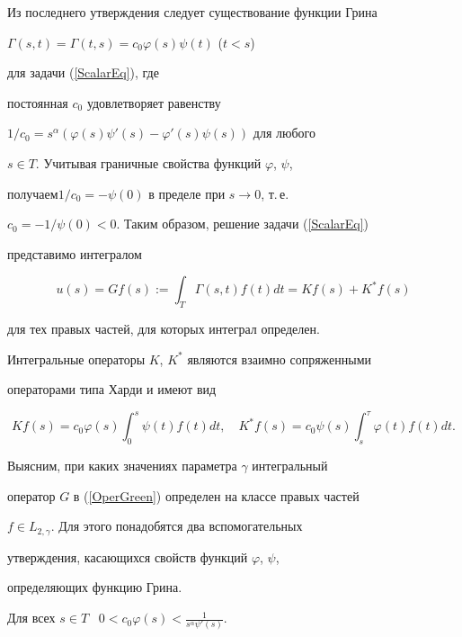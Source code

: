 Из последнего утверждения следует существование функции Грина


$\Gamma(s,t)=\Gamma(t,s)=c_0\varphi(s)\psi(t)$ ($t<s$)


для задачи (\ref{ScalarEq}), где


постоянная $c_0$ удовлетворяет равенству


$1/c_0=s^\alpha(\varphi(s)\psi'(s)-\varphi'(s)\psi(s))$ для любого


$s \in T$. Учитывая граничные свойства функций $\varphi$, $\psi$,


получаем\linebreak $1/c_0=-\psi(0)$ в пределе при $s \to 0$, т.\,е.


$c_0=-1/\psi(0)<0$. Таким образом, решение задачи (\ref{ScalarEq})


представимо интегралом


\begin{equation}\label{OperGreen}


u(s)=Gf(s):=\int_T \Gamma(s,t)f(t) dt=Kf(s)+K^*f(s)


\end{equation}


для тех правых частей, для которых интеграл определен.


Интегральные операторы $K$, $K^*$ являются взаимно сопряженными


операторами типа Харди и имеют вид


\begin{equation}\label{GreenHardi}


Kf(s)=c_0\varphi(s)\int_0^s \psi(t) f(t) dt, \quad K^*f(s)=


c_0 \psi(s) \int_s^\tau \varphi(t) f(t) dt.


\end{equation}


Выясним, при каких значениях параметра $\gamma$ интегральный


оператор $G$ в (\ref{OperGreen}) определен на классе правых частей


$f \in L_{2,\gamma}$. Для этого понадобятся два вспомогательных


утверждения, касающихся свойств функций $\varphi$, $\psi$,


определяющих функцию Грина.








\begin{lems}\label{phi}


Для всех $s \in T$ \ $0<c_0\varphi(s)<\frac{1}{s^\alpha \psi'(s)}$.


\end{lems}








